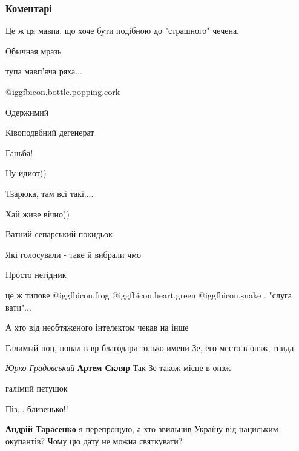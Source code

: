  
 
 
 
 
\subsubsection{Коментарі}
\label{sec:31_10_2021.fb.tarasenko_andrej.1.artem_dmitruk_ugrozy.cmt}

\begin{itemize} %
Це ж ця мавпа, що хоче бути подібною до "страшного" чечена.

Обычная мразь

тупа мавп'яча ряха...

 @igg{fbicon.bottle.popping.cork} 

Одержимий

Ківоподвбний дегенерат

Ганьба!

Ну идиот))

Тварюка, там всі такі....

Хай живе вічно))

Ватний сепарський покидьок

Які голосували - таке й вибрали чмо

Просто негідник

це ж типове  @igg{fbicon.frog}  @igg{fbicon.heart.green}  @igg{fbicon.snake}  . "слуга вати"...

А хто від необтяженого інтелектом чекав на інше

Галимый поц, попал в вр благодаря только имени Зе, его место в опзж, гнида

\emph{Юрко Градовський}
\textbf{Артем Скляр} Так Зе також місце в опзж

галімий пєтушок

Піз... близенько!!

\textbf{Андрій Тарасенко} я перепрощую, а хто звильнив Україну від нациським окупантів? Чому цю дату не можна святкувати?


\end{itemize}
